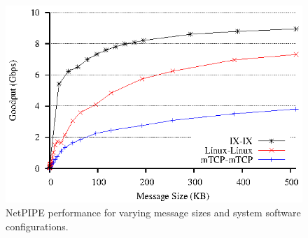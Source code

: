 \begin{figure}
\begin{centering}
\includegraphics{figs/pingpong.eps}
\caption{NetPIPE performance for varying message sizes and system software configurations.}
\label{fig:pingpong}
\end{centering}
\end{figure}

